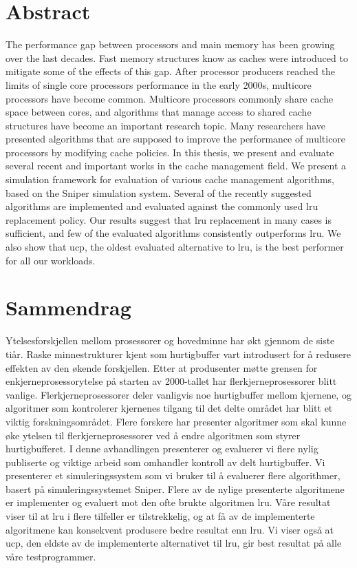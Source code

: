 
\section*{Abstract}

The performance gap between processors and main memory has been growing over the last decades.
Fast memory structures know as caches were introduced to mitigate some of the effects of this gap.
After processor producers reached the limits of single core processors performance in the early 2000s, multicore processors have become common.
Multicore processors commonly share cache space between cores, and algorithms that manage access to shared cache structures have become an important research topic.
Many researchers have presented algorithms that are supposed to improve the performance of multicore processors by modifying cache policies.
In this thesis, we present and evaluate several recent and important works in the cache management field.
We present a simulation framework for evaluation of various cache management algorithms, based on the Sniper simulation system.
Several of the recently suggested algorithms are implemented and evaluated against the commonly used \gls{lru} replacement policy.
Our results suggest that \gls{lru} replacement in many cases is sufficient, and few of the evaluated algorithms consistently outperforms \gls{lru}.
We also show that \gls{ucp}, the oldest evaluated alternative to \gls{lru}, is the best performer for all our workloads.

\glsresetall
\clearpage

\section*{Sammendrag}
Ytelsesforskjellen mellom prosessorer og hovedminne har økt gjennom de siste tiår.
Raske minnestrukturer kjent som hurtigbuffer vart introdusert for å redusere effekten av den økende forskjellen.
Etter at produsenter møtte grensen for enkjerneprosessorytelse på starten av 2000-tallet har flerkjerneprosessorer blitt vanlige.
Flerkjerneprosessorer deler vanligvis noe hurtigbuffer mellom kjernene, og algoritmer som kontrolerer kjernenes tilgang til det delte området har blitt et viktig forskningsområdet.
Flere forskere har presenter algoritmer som skal kunne øke ytelsen til flerkjerneprosessorer ved å endre algoritmen som styrer hurtigbufferet.
I denne avhandlingen presenterer og evaluerer vi flere nylig publiserte og viktige arbeid som omhandler kontroll av delt hurtigbuffer.
Vi presenterer et simuleringssystem som vi bruker til å evaluerer flere algorithmer, basert på simuleringssystemet Sniper.
Flere av de nylige presenterte algoritmene er implementer og evaluert mot den ofte brukte algoritmen \gls{lru}.
Våre resultat viser til at \gls{lru} i flere tilfeller er tilstrekkelig, og at få av de implementerte algoritmene kan konsekvent produsere bedre resultat enn \gls{lru}.
Vi viser også at \gls{ucp}, den eldste av de implementerte alternativet til \gls{lru}, gir best resultat på alle våre testprogrammer.

\clearpage
